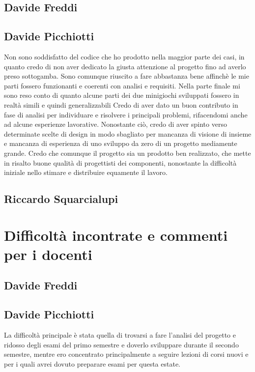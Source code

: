 \documentclass[a4paper,12pt]{report}
\begin{document}
    \subsection{Davide Freddi}
    \subsection{Davide Picchiotti}
    Non sono soddisfatto del codice che ho prodotto nella maggior parte dei casi, in quanto credo di non aver dedicato la giusta attenzione
    al progetto fino ad averlo preso sottogamba.
    Sono comunque riuscito a fare abbastanza bene affinchè le mie parti fossero funzionanti e coerenti con analisi e requisiti.\newline
    Nella parte finale mi sono reso conto di quanto alcune parti dei due minigiochi sviluppati fossero in realtà simili e quindi generalizzabili\newline
    Credo di aver dato un buon contributo in fase di analisi per individuare e risolvere i principali problemi, rifacendomi anche ad alcune esperienze lavorative.
    Nonostante ciò, credo di aver spinto verso determinate scelte di design in modo sbagliato per mancanza di visione di insieme e mancanza
    di esperienza di uno sviluppo da zero di un progetto mediamente grande.\newline
    Credo che comunque il progetto sia un prodotto ben realizzato, che mette in risalto buone qualità di progettisti dei componenti,
    nonostante la difficoltà iniziale nello stimare e distribuire equamente il lavoro.

    \subsection{Riccardo Squarcialupi}

    \section{Difficoltà incontrate e commenti per i docenti}

	\subsection{Davide Freddi}
	\subsection{Davide Picchiotti}
    La difficoltà principale è stata quella di trovarsi a fare l'analisi del progetto e ridosso degli esami del primo semestre e doverlo sviluppare
    durante il secondo semestre, mentre ero concentrato principalmente a seguire lezioni di corsi nuovi e per i quali avrei dovuto preparare esami per questa estate.
\end{document}
